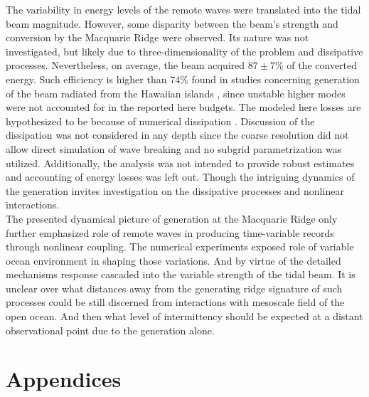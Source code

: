 \documentclass[12pt]{article}
\begin{document}
The variability in energy levels of the remote waves were translated into the tidal beam magnitude. 
However, some disparity between the beam's strength and conversion by the Macquarie Ridge were 
observed. Its nature was not investigated, but likely due to three-dimensionality of the problem 
and dissipative processes. Nevertheless, on average, the beam acquired $87 \pm 7\%$ of the 
converted 
energy. 
Such efficiency is higher than $74\%$ found in studies concerning generation of the beam radiated 
from the Hawaiian islands \citep{carter2008energetics}, since unstable higher modes were not 
accounted for in the reported here budgets. The modeled here losses are hypothesized to be because 
of numerical dissipation \citep{di2006numerical}. Discussion of the dissipation was not considered 
in any depth since the coarse resolution did not 
allow direct simulation of wave breaking and no subgrid parametrization was utilized. Additionally, 
the analysis was not intended to provide robust estimates and accounting of energy losses 
was left out. Though the intriguing dynamics of the generation invites investigation on the 
dissipative processes and nonlinear interactions.\\

The presented dynamical picture of generation at the Macquarie Ridge only further emphasized role 
of remote waves in producing time-variable records through nonlinear coupling. The numerical 
experiments 
exposed role of 
variable ocean environment in shaping those variations. And by virtue of the detailed mechanisms 
response cascaded into the variable strength of the tidal beam. It is unclear over 
what distances away from the generating ridge signature of such processes could be still discerned 
from interactions with mesoscale field of the open ocean. And then what level of 
intermittency should be expected at a distant observational point due to the generation alone.

\section*{Appendices}

\renewcommand{\thesubsection}{\Alph{subsection}}
\setcounter{subsection}{0}
\end{document}
